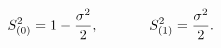 \begin{equation}
S_{(0)}^2=1-\frac{\sigma ^2}2
,\hspace{0.5in}S_{(1)}^2=\frac{\sigma ^2}2 .\label{73}
\end{equation}

